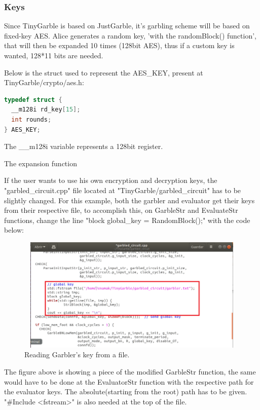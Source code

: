 \begin{refsection}
\subsubsection{Keys}

Since TinyGarble is based on JustGarble, it's garbling scheme will be based on fixed-key AES.
Alice generates a random key, 'with the randomBlock() function', that will then be expanded 10 times (128bit AES), thus if a custom key is wanted, 128*11 bits are needed.

Below is the struct used to represent the AES_KEY, present at TinyGarble/crypto/aes.h:

\begin{lstlisting}[caption={AES_KEY struct}, language=C, captionpos=b]
typedef struct {
  __m128i rd_key[15];
  int rounds;
} AES_KEY;
\end{lstlisting}

The __m128i variable represents a 128bit register.

The expansion function


 If the user wants to use his own encryption and decryption keys, the "garbled\_circuit.cpp" file located at "TinyGarble/garbled\_circuit" has to be slightly changed. For this example, both the garbler and evaluator get their keys from their respective file, to accomplish this, on GarbleStr and EvaluateStr functions, change the line "block global\_key =  RandomBlock();" with the code below:

\begin{figure}[H]
	\centering
	\includegraphics[width=1\textwidth, height=5.5cm]{./sdf/tiny_garble/figures/key_file.png}
    \caption{Reading Garbler's key from a file.}\label{fig:key_file}
\end{figure}

The figure above is showing a piece of the modified GarbleStr function, the same would have to be done at the EvaluatorStr function with the respective path for the evaluator keys. The absolute(starting from the root) path has to be given. "\#Include <fstream>" is also needed at the top of the file. 


\end{refsection}
